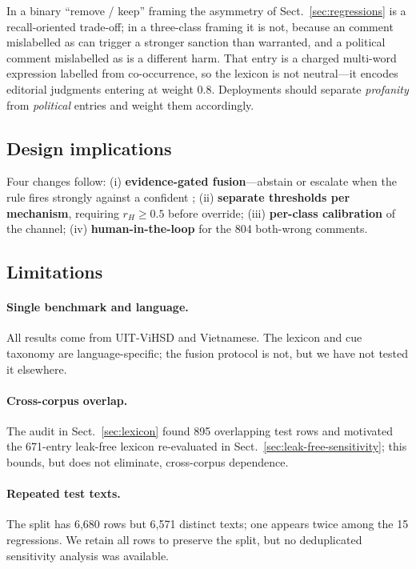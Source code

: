 In a binary ``remove / keep'' framing the asymmetry of Sect.~\ref{sec:regressions} is
a recall-oriented trade-off; in a three-class framing it is not, because an \off{}
comment mislabelled as \hate{} can trigger a stronger sanction than warranted, and a
political comment mislabelled as \hate{} is a different harm. That entry is a charged
multi-word expression labelled \hate{} from co-occurrence, so the lexicon is not
neutral---it encodes editorial judgments entering at weight 0.8. Deployments should
separate \emph{profanity} from \emph{political} entries and weight them accordingly.

\subsection{Design implications}

\label{sec:implications}

Four changes follow: (i) \textbf{evidence-gated fusion}---abstain or escalate when
the rule fires strongly against a confident \clean{}; (ii) \textbf{separate thresholds
per mechanism}, requiring $r_H\ge0.5$ before override; (iii) \textbf{per-class
calibration} of the \clean{} channel; (iv) \textbf{human-in-the-loop} for the 804
both-wrong comments.

\subsection{Limitations}

\label{sec:limitations}

\paragraph{Single benchmark and language.}
All results come from UIT-ViHSD \cite{luu2021vihsd} and Vietnamese. The lexicon and cue taxonomy are
language-specific; the fusion protocol is not, but we have not tested it
elsewhere.

\paragraph{Cross-corpus overlap.}
The audit in Sect.~\ref{sec:lexicon} found 895 overlapping test rows and motivated the
671-entry leak-free lexicon re-evaluated in Sect.~\ref{sec:leak-free-sensitivity};
this bounds, but does not eliminate, cross-corpus dependence.

\paragraph{Repeated test texts.}
The split has 6{,}680 rows but 6{,}571 distinct texts; one appears twice among the 15
regressions. We retain all rows to preserve the split, but no deduplicated sensitivity
analysis was available.

